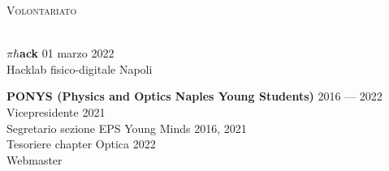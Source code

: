 \documentclass[a4paper]{article}
\newcommand{\lineunder} {
  \vspace*{-8pt} \\
  \hspace*{-18pt} \hrulefill \\
}
\newcommand{\header} [1] {
  {\hspace*{-18pt}\vspace*{6pt} \textsc{#1}}
  \vspace*{-6pt} \lineunder
}
\begin{document}
\header{Volontariato}
\vspace{1mm}

\(\pi\hbar\)\textbf{ack} \hfill 01 marzo 2022 \\
Hacklab fisico-digitale \hfill Napoli \\
\vspace{2mm}

\textbf{PONYS (Physics and Optics Naples Young Students)} \hfill 2016 --- 2022\\
Vicepresidente \hfill 2021\\
Segretario sezione EPS Young Minds \hfill 2016, 2021\\
Tesoriere chapter Optica \hfill 2022\\
Webmaster\\
\vspace{2mm}
\end{document}
